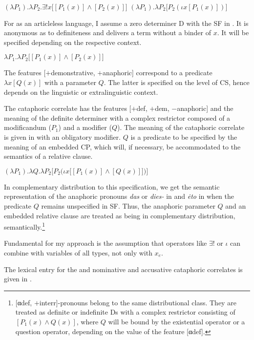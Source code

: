 \documentclass[output=paper]{langscibook}
\begin{document}
\ea
\ea $(\lambda P_1) . \lambda P_2 . \exists!x \big[[P_1 (x)] \wedge [P_2 (x)]\big]$ \label{ex:zimmermann:def1}
\ex $(\lambda P_1) . \lambda P_2 \big[P_2 (\iota x [P_1 (x)])\big]$ \label{ex:zimmermann:def2}
\z\z

\noindent For  as an articleless language, I assume a zero determiner D with the SF in . It is anonymous as to definiteness and delivers a term without a binder of $x$. It will be specified depending on the respective context.

\ea\label{ex:zimmermann:Det_Russ} $\lambda P_1 . \lambda P_2 \big[[P_1 (x)] \wedge [P_2 (x)]\big]$ \z

\noindent The features [$+$demonstrative, $+$anaphoric] correspond to a predicate $\lambda x [Q (x)]$ with a parameter $Q$. The latter is specified on the level of CS, hence depends on the linguistic or extralinguistic context.

The cataphoric correlate has the features [$+$def, $+$dem, $-$anaphoric] and the meaning of the definite determiner with a complex restrictor composed of a modificandum ($P_1$) and a modifier ($Q$). The meaning of the cataphoric correlate is given in  with an obligatory modifier. $Q$ is a predicate to be specified by the meaning of an embedded CP, which will, if necessary, be accommodated to the semantics of a relative clause.

\ea\label{ex:zimmermann:defDet} $(\lambda P_1) . \lambda Q . \lambda P_2 \Big[P_2 \big(\iota x \big[[P_1 (x)]\wedge [Q (x)]\big]\big)\Big]$ \z

\noindent In complementary distribution to this specification, we get the semantic representation of the anaphoric pronouns \textit{das} or \textit{dies-} in  and \textit{ėto} in  when the predicate $Q$ remains unspecified in SF. Thus, the anaphoric parameter $Q$ and an embedded relative clause are treated as being in complementary distribution, semantically.\footnote{[αdef, $+$interr]-pronouns belong to the same distributional class. They are treated as definite or indefinite Ds with a complex restrictor consisting of $[P_1 (x) \wedge Q (x)]$, where $Q$ will be bound by the existential operator or a question operator, depending on the value of the feature [αdef].}

Fundamental for my approach is the assumption that operators like $\exists$! or $\iota$ can combine with variables of all types, not only with $x_{e}$.

The lexical entry for the  and  nominative and accusative cataphoric correlates is given in .
\end{document}

